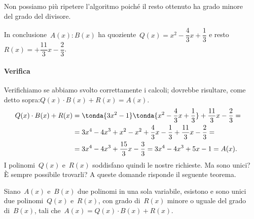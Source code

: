 \begin{esempio}
\begin{enumerate*}
{}
 \item 
{}
 \item 
{}
\end{enumerate*}

Non possiamo più ripetere l'algoritmo poiché il resto ottenuto ha grado 
minore del grado del divisore.

In conclusione~\(A(x):B(x)\) ha 
quoziente~\(Q(x)=x^2-\dfrac{4}{3}x+\dfrac{1}{3}\) e 
resto~\(R(x)=+{\dfrac{11}{3}}x-\dfrac{2}{3}\).

\paragraph{Verifica}
Verifichiamo se abbiamo svolto correttamente i calcoli; dovrebbe risultare, 
come detto sopra:\(Q(x)\cdot B(x)+R(x) = A(x)\).
\begin{equation*}
\begin{split}
Q(x)\cdot B(x)+R(x) &= 
\tonda{3x^2-1}\tonda{x^2-\dfrac{4}{3}x+\dfrac{1}{3}}+
\dfrac{11}{3}x-\dfrac{2}{3} =\\ 
&=3x^4-4x^3+x^2-x^2+\dfrac{4}{3}x-
  \dfrac{1}{3}+\dfrac{11}{3}x-\dfrac{2}{3}=\\
&= 3x^4-4x^3+\dfrac{15}{3}x-\dfrac{3}{3}
= 3x^4-4x^3+5x-1 = A(x).
\end{split}
\end{equation*}
I polinomi~\(Q(x)\) e~\(R(x)\) soddisfano quindi le nostre richieste. 
Ma sono unici? È sempre possibile trovarli? 
A queste domande risponde il seguente teorema.
 \end{esempio}

\begin{teorema}
 Siano~\(A(x)\) e~\(B(x)\) due polinomi in una sola variabile, esistono e sono 
 unici due polinomi~\(Q(x)\) e~\(R(x)\), con grado di~\(R(x)\)
 minore o uguale del grado di~\(B(x)\), tali che~\(A(x)=Q(x)\cdot B(x)+R(x)\).
\end{teorema}

